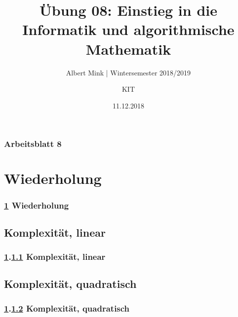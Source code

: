 \documentclass[c,18pt]{beamer}
\date{11.12.2018}
\title[Übung 08: Einstieg in die Informatik und algorithmische]
  {Übung 08: Einstieg in die Informatik und algorithmische \\ Mathematik}
\subtitle{Albert Mink | Wintersemester 2018/2019}
\author[Albert Mink, ]{KIT}
\institute[Institut für Angewandte und Numerische Mathematik (IANM)]{Institut für Angewandte und Numerische Mathematik}
\begin{document}
\begin{frame}
  \maketitle
\end{frame}

\begin{frame}
  \frametitle{Arbeitsblatt 8}%
\tableofcontents
\end{frame}


\section{Wiederholung}\label{K:wdh}
\begin{frame}
  \frametitle{\ref{K:wdh} Wiederholung}%
\tableofcontents[current]
\end{frame}

\def\stitle{Komplexit\"at, linear}
\subsection{\stitle}\label{S:Lin}
\begin{frame}[t]%
  \frametitle{\ref{K:wdh}.\ref{S:Lin} \stitle}
\medskip




\end{frame}


\def\stitle{Komplexit\"at, quadratisch}
\subsection{\stitle}\label{S:Quad}
\begin{frame}[t]%
  \frametitle{\ref{K:wdh}.\ref{S:Quad} \stitle}
\medskip


\end{frame}
\end{document}
